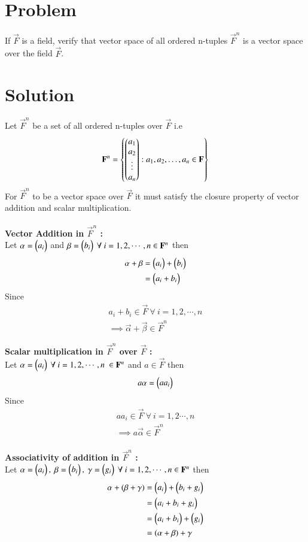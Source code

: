 \documentclass[journal,12pt,twocolumn]{IEEEtran}
\begin{document}
\section{Problem}
If $\vec{F}$ is a field, verify that vector space of all ordered n-tuples $\vec{F}^n$ is a 
vector space over the field $\vec{F}$.
\section{Solution}
Let $\vec{F}^n$ be a set of all ordered n-tuples over $\vec{F}$ i.e
\begin{align}
	\mathbf{F}^n= \left\{\begin{pmatrix}a_1 \\ a_2 \\ \vdots \\ a_n\end{pmatrix} : 
	a_1, a_2, \ldots, a_n \in \mathbf{F} \right\}
\end{align}
For $\vec{F}^n$ to be a vector space over $\vec{F}$ it must satisfy the 
closure property of vector addition and scalar multiplication. \\
\\
{\bf Vector Addition in $\vec{F}^n$ :} \\
Let $\mathbf{\alpha} = \begin{pmatrix}a_i\end{pmatrix}$ and
$\mathbf{\beta} = \begin{pmatrix}b_i\end{pmatrix} \ \forall \  i=1,2,\cdots,n \in \mathbf{F}^n$ 
then 
\begin{align}
	\mathbf{\alpha} + \mathbf{\beta} 
	&=\begin{pmatrix}a_i\end{pmatrix}+\begin{pmatrix}b_i\end{pmatrix} \\
	&=\begin{pmatrix}a_i+b_i\end{pmatrix} 
\end{align}
Since 
\begin{align}
	a_i+b_i \in \vec{F} \ \forall \  i=1,2,\cdots,n \\
	\implies \vec{\alpha}+\vec{\beta} \in \vec{F}^n
\end{align}

{\bf Scalar multiplication in $\vec{F}^n$ over $\vec{F}$ :} \\
Let $\vec{\alpha} = \myvec{a_i} \ \forall \ i=1,2,\cdots,n \  
	\in \vec{F}^n$ and  $ a \in \vec{F}$ then
\begin{align}
	a\mathbf{\alpha}=\begin{pmatrix}aa_i\end{pmatrix}
\end{align}
Since
\begin{align}
	aa_i \in \vec{F} \ \forall \ i=1,2\cdots,n \\
	\implies a\vec{\alpha} \in \vec{F}^n
\end{align}
\\
{\bf Associativity of addition in $\vec{F}^n$ :} \\
Let $\vec{\alpha}=\myvec{a_i}, \ 
\vec{\beta}=\myvec{b_i}, 
\ \vec{\gamma}=\myvec{g_i} 
\ \forall \ i=1,2,\cdots,n
\in \vec{F}^n$ then
\begin{align}
	\mathbf{\alpha}+(\mathbf{\beta}+\mathbf{\gamma}) &= 
	\begin{pmatrix}a_i\end{pmatrix} + 
      \begin{pmatrix}b_i+g_i\end{pmatrix} \\
	&= \begin{pmatrix}a_i+b_i+g_i\end{pmatrix} \\
	&= \begin{pmatrix}a_i+b_i\end{pmatrix} + \begin{pmatrix}g_i\end{pmatrix} \\
	&=(\alpha+\beta)+\gamma
\end{align}
\end{document}
